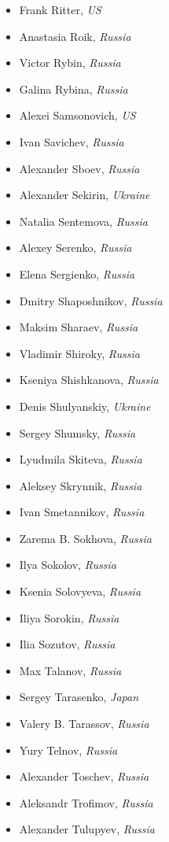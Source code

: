 \documentclass[10pt,fleqn,openany]{book} %
\begin{document}
\begin{multicols}{2}
\begin{itemize}
			\item Frank Ritter, \textit{US}
			\item Anastasia Roik, \textit{Russia}
			\item Victor Rybin, \textit{Russia}
			\item Galina Rybina, \textit{Russia}
			\item Alexei Samsonovich, \textit{US}
			\item Ivan Savichev, \textit{Russia}
			\item Alexander Sboev, \textit{Russia}
			\item Alexander Sekirin, \textit{Ukraine}
			\item Natalia Sentemova, \textit{Russia}
			\item Alexey Serenko, \textit{Russia}
			\item Elena Sergienko, \textit{Russia}
			\item Dmitry Shaposhnikov, \textit{Russia}
			\item Maksim Sharaev, \textit{Russia}
			\item Vladimir Shiroky, \textit{Russia}
			\item Kseniya Shishkanova, \textit{Russia}
			\item Denis Shulyanskiy, \textit{Ukraine}
			\item Sergey Shumsky, \textit{Russia}
			\item Lyudmila Skiteva, \textit{Russia}
			\item Aleksey Skrynnik, \textit{Russia}
			\item Ivan Smetannikov, \textit{Russia}
			\item Zarema B. Sokhova, \textit{Russia}
			\item Ilya Sokolov, \textit{Russia}
			\item Ksenia Solovyeva, \textit{Russia}
			\item Iliya Sorokin, \textit{Russia}
			\item Ilia Sozutov, \textit{Russia}
			\item Max Talanov, \textit{Russia}
			\item Sergey Tarasenko, \textit{Japan}
			\item Valery B. Tarassov, \textit{Russia}
			\item Yury Telnov, \textit{Russia}
			\item Alexander Toschev, \textit{Russia}
			\item Aleksandr Trofimov, \textit{Russia}
			\item Alexander Tulupyev, \textit{Russia}

\end{itemize}
\end{multicols}
\end{document}
